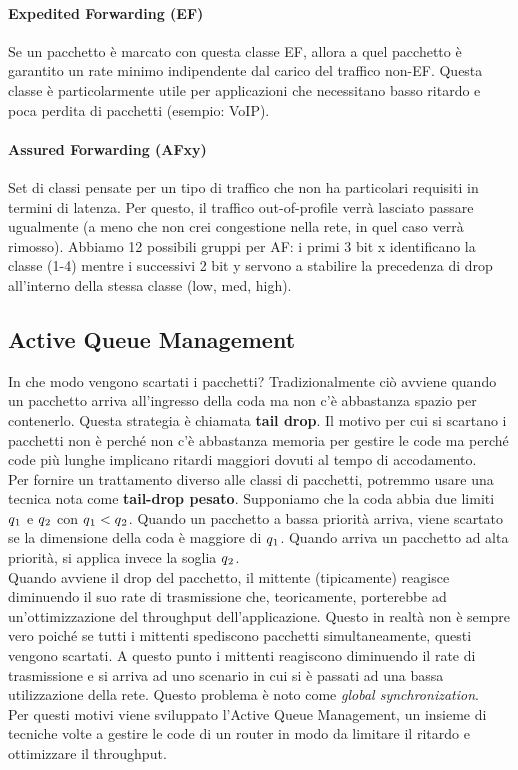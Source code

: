 \documentclass{article}
\begin{document}
\paragraph{Expedited Forwarding (EF)} Se un pacchetto è marcato con questa classe EF, allora a quel pacchetto è garantito un rate minimo indipendente dal carico del traffico non-EF. Questa classe è particolarmente utile per applicazioni che necessitano basso ritardo e poca perdita di pacchetti (esempio: VoIP).
\paragraph{Assured Forwarding (AFxy)} Set di classi pensate per un tipo di traffico che non ha particolari requisiti in termini di latenza. Per questo, il traffico out-of-profile verrà lasciato passare ugualmente (a meno che non crei congestione nella rete, in quel caso verrà rimosso). Abbiamo 12 possibili gruppi per AF: i primi 3 bit x identificano la classe (1-4) mentre i successivi 2 bit y servono a stabilire la precedenza di drop all'interno della stessa classe (low, med, high).\\

\subsection{Active Queue Management}
In che modo vengono scartati i pacchetti? Tradizionalmente ciò avviene quando un pacchetto arriva all'ingresso della coda ma non c'è abbastanza spazio per contenerlo. Questa strategia è chiamata \textbf{tail drop}. Il motivo per cui si scartano i pacchetti non è perché non c'è abbastanza memoria per gestire le code ma perché code più lunghe implicano ritardi maggiori dovuti al tempo di accodamento.\\
Per fornire un trattamento diverso alle classi di pacchetti, potremmo usare una tecnica nota come \textbf{tail-drop pesato}. Supponiamo che la coda abbia due limiti \(q\textsubscript{1}\) e \(q\textsubscript{2}\) con \(q\textsubscript{1} < q\textsubscript{2} \). Quando un pacchetto a bassa priorità arriva, viene scartato se la dimensione della coda è maggiore di \(q\textsubscript{1}\). Quando arriva un pacchetto ad alta priorità, si applica invece la soglia \(q\textsubscript{2}\).\\
Quando avviene il drop del pacchetto, il mittente (tipicamente) reagisce diminuendo il suo rate di trasmissione che, teoricamente, porterebbe ad un'ottimizzazione del throughput dell'applicazione. Questo in realtà non è sempre vero poiché se tutti i mittenti spediscono pacchetti simultaneamente, questi vengono scartati. A questo punto i mittenti reagiscono diminuendo il rate di trasmissione e si arriva ad uno scenario in cui si è passati ad una bassa utilizzazione della rete. Questo problema è noto come \textit{global synchronization}.\\
Per questi motivi viene sviluppato l'Active Queue Management, un insieme di tecniche volte a gestire le code di un router in modo da limitare il ritardo e ottimizzare il throughput.\\
\end{document}

